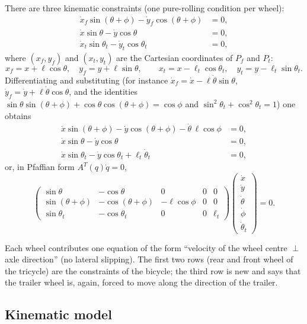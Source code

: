 \documentclass[11pt,a4paper]{article}
\def\bm#1{#1}%
\newcommand{\qv}{\bm{q}}
\theoremstyle{definition}
\theoremstyle{plain}
\theoremstyle{remark}
\begin{document}
There are three kinematic constraints (one pure-rolling condition per wheel):
\begin{align*}
 \dot x_f\sin(\theta+\phi)-\dot y_f\cos(\theta+\phi)&=0,\\
 \dot x\sin\theta-\dot y\cos\theta&=0,\\
 \dot x_t\sin\theta_t-\dot y_t\cos\theta_t&=0,
\end{align*}
where $(x_f,y_f)$ and $(x_t,y_t)$ are the Cartesian coordinates of $P_f$ and $P_t$:
\[
 x_f=x+\ell\cos\theta,\quad y_f=y+\ell\sin\theta,\qquad
 x_t=x-\ell_t\cos\theta_t,\quad y_t=y-\ell_t\sin\theta_t .
\]
Differentiating and substituting (for instance $\dot x_f=\dot x-\ell\dot\theta\sin\theta$, $\dot y_f=\dot y+\ell\dot\theta\cos\theta$, and the identities $\sin\theta\sin(\theta+\phi)+\cos\theta\cos(\theta+\phi)=\cos\phi$ and $\sin^2\theta_t+\cos^2\theta_t=1$) one obtains
\begin{align*}
 \dot x\sin(\theta+\phi)-\dot y\cos(\theta+\phi)-\dot\theta\,\ell\cos\phi&=0,\\
 \dot x\sin\theta-\dot y\cos\theta&=0,\\
 \dot x\sin\theta_t-\dot y\cos\theta_t+\ell_t\dot\theta_t&=0,
\end{align*}
or, in Pfaffian form $A^T(\qv)\dot{\qv}=0$,
\[
 \begin{pmatrix}
  \sin\theta&-\cos\theta&0&0&0\\
  \sin(\theta+\phi)&-\cos(\theta+\phi)&-\ell\cos\phi&0&0\\
  \sin\theta_t&-\cos\theta_t&0&0&\ell_t
 \end{pmatrix}
 \begin{pmatrix}\dot x\\\dot y\\\dot\theta\\\dot\phi\\\dot\theta_t\end{pmatrix}=0 .
\]

\begin{intuition}
Each wheel contributes one equation of the form ``velocity of the wheel centre $\perp$ axle direction'' (no lateral slipping). The first two rows (rear and front wheel of the tricycle) are the constraints of the bicycle; the third row is new and says that the trailer wheel is, again, forced to move along the direction of the trailer.
\end{intuition}

\subsection{Kinematic model}
\end{document}
